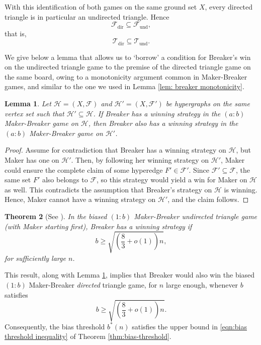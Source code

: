 \documentclass{article}
\theoremstyle{definition}
\theoremstyle{plain}
\newtheorem{theo}{Theorem}[section]
\newtheorem{lem}[theo]{Lemma}
\theoremstyle{remark}
\theoremstyle{definition}
\begin{document}
With this identification of both games on the same ground set $X$, every directed triangle is in particular an undirected triangle. Hence
\[
\mathcal F_{\mathrm{dir}}\subseteq \mathcal F_{\mathrm{und}},
\]
that is,
\[
\mathcal T_{\mathrm{dir}}\subseteq \mathcal T_{\mathrm{und}}.
\]


We give below a lemma that allows us to `borrow' a condition for Breaker's win on the undirected triangle game to the premise of the directed triangle game on the same board, owing to a monotonicity argument common in Maker-Breaker games, and similar to the one we used in Lemma \ref{lem: breaker monotonicity}.

\begin{lem}\label{lem:transfer}
Let $\mathcal{H}=(X,\mathcal{F})$ and $\mathcal{H}'=(X,\mathcal{F}')$ be hypergraphs on the same vertex set such that $\mathcal{H}' \subseteq \mathcal{H}$. 
If Breaker has a winning strategy in the $(a:b)$ Maker-Breaker game on $\mathcal{H}$, then Breaker also has a winning strategy in the $(a:b)$ Maker-Breaker game on $\mathcal{H}'$.
\end{lem}

\begin{proof}
Assume for contradiction that Breaker has a winning strategy on $\mathcal{H}$, but Maker has one on $\mathcal{H}'$. 
Then, by following her winning strategy on $\mathcal{H}'$, Maker could ensure the complete claim of some hyperedge $F' \in \mathcal{F}'$. 
Since $\mathcal{F}' \subseteq \mathcal{F}$, the same set $F'$ also belongs to $\mathcal{F}$, so this strategy would yield a win for Maker on $\mathcal{H}$ as well. 
This contradicts the assumption that Breaker’s strategy on $\mathcal{H}$ is winning. 
Hence, Maker cannot have a winning strategy on $\mathcal{H}'$, and the claim follows.
\end{proof}

\begin{theo}[See \cite{glazik2022new}]
    In the biased $(1:b)$ Maker-Breaker undirected triangle game (with Maker starting first), Breaker has a winning strategy if \[b \ge \sqrt{\left(\frac{8}{3} + o(1)\right)n},\] for sufficiently large $n$.
\end{theo}

This result, along with Lemma \ref{lem:transfer}, implies that Breaker would also win the biased $(1:b)$ Maker-Breaker \emph{directed} triangle game, for $n$ large enough, whenever $b$ satisfies 
\begin{equation}
    b \ge \sqrt{\left(\frac{8}{3} + o(1)\right)n}.
\end{equation}
Consequently, the bias threshold $b^*(n)$ satisfies the upper bound in \eqref{eqn:bias threshold inequality} of Theorem \ref{thm:bias-threshold}.
\end{document}
